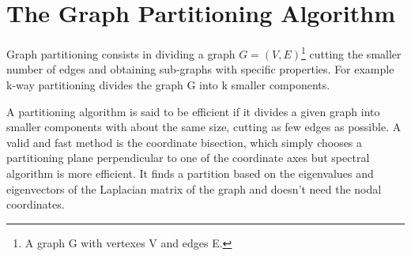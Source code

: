 \documentclass[]{usiinfbachelorproject}
\begin{document}
\section{The Graph Partitioning Algorithm} \label{sec:graphpart} 
Graph partitioning consists in dividing a graph $G=(V,E)$\footnote{A graph G with vertexes V and edges E.}  cutting the smaller number of edges and obtaining sub-graphs with specific properties. For example k-way partitioning divides the graph G into k smaller components.

A partitioning algorithm is said to be efficient if it divides a given graph into smaller components with about the same size, cutting as few edges as possible. 
A valid and fast method is the coordinate bisection, which simply chooses a partitioning plane perpendicular to one of the coordinate axes but spectral algorithm is more efficient. It finds a partition based on the eigenvalues and eigenvectors of the Laplacian matrix of the graph and doesn't need the nodal coordinates.
\end{document}
